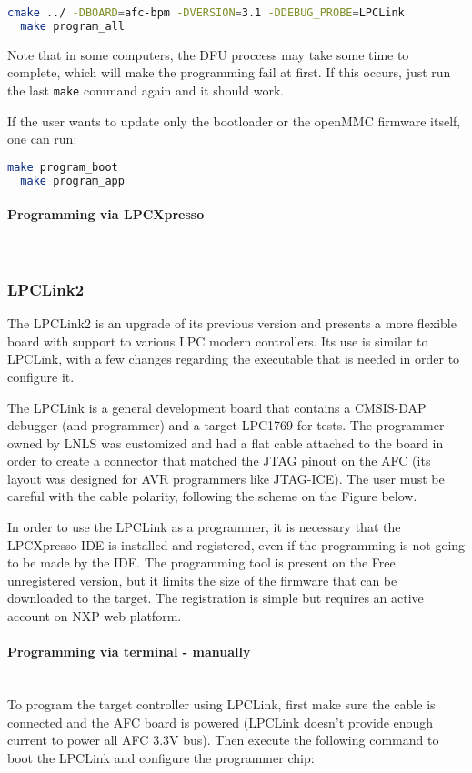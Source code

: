 \documentclass[letterpaper,12pt, titlepage]{article}
\newcommand{\newparagraph}[1]{\paragraph{#1}\mbox{}\\}
\begin{document}
\begin{lstlisting}[language=bash]
  cmake ../ -DBOARD=afc-bpm -DVERSION=3.1 -DDEBUG_PROBE=LPCLink
  make program_all
\end{lstlisting}

Note that in some computers, the DFU proccess may take some time to complete, which will make the programming fail at first. If this occurs, just run the last \texttt{make} command again and it should work.

If the user wants to update only the bootloader or the openMMC firmware itself, one can run:

\begin{lstlisting}[language=bash]
  make program_boot
  make program_app
\end{lstlisting}


\newparagraph{Programming via LPCXpresso}


\subsubsection{LPCLink2}
The LPCLink2 is an upgrade of its previous version and presents a more flexible board with support to various LPC modern controllers. Its use is similar to LPCLink, with a few changes regarding the executable that is needed in order to configure it.

The LPCLink is a general development board that contains a CMSIS-DAP debugger (and programmer) and a target LPC1769 for tests. The programmer owned by LNLS was customized and had a flat cable attached to the board in order to create a connector that matched the JTAG pinout on the AFC (its layout was designed for AVR programmers like JTAG-ICE).
The user must be careful with the cable polarity, following the scheme on the Figure below.


In order to use the LPCLink as a programmer, it is necessary that the LPCXpresso IDE is installed and registered, even if the programming is not going to be made by the IDE. The programming tool is present on the Free unregistered version, but it limits the size of the firmware that can be downloaded to the target. The registration is simple but requires an active account on NXP web platform.


\newparagraph{Programming via terminal - manually}
To program the target controller using LPCLink, first make sure the cable is connected and the AFC board is powered (LPCLink doesn't provide enough current to power all AFC 3.3V bus). Then execute the following command to boot the LPCLink and configure the programmer chip:
\end{document}
